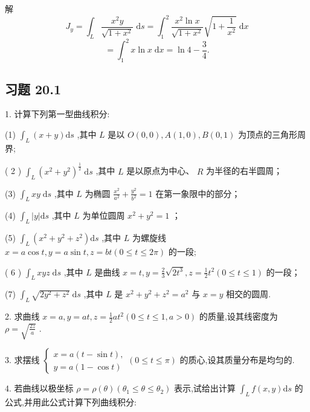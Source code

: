 解
\[
{J}_{y} = {\int }_{L}\frac{{x}^{2}y}{\sqrt{1 + {x}^{2}}}\mathrm{\;d}s = {\int }_{1}^{2}\frac{{x}^{2}\ln x}{\sqrt{1 + {x}^{2}}}\sqrt{1 + \frac{1}{{x}^{2}}}\mathrm{\;d}x
\]
\[
= {\int }_{1}^{2}x\ln x\mathrm{\;d}x = \ln 4 - \frac{3}{4}.
\]
\subsection{习题 20.1}

1. 计算下列第一型曲线积分:

(1) \({\int }_{L}\left( {x + y}\right) \mathrm{d}s\) ,其中 \(L\) 是以 \(O\left( {0,0}\right) ,A\left( {1,0}\right) ,B\left( {0,1}\right)\) 为顶点的三角形周界;

( 2 ) \({\int }_{L}{\left( {x}^{2} + {y}^{2}\right) }^{\frac{1}{2}}\mathrm{\;d}s\) ,其中 \(L\) 是以原点为中心、 \(R\) 为半径的右半圆周；

(3) \({\int }_{L}{xy}\mathrm{\;d}s\) ,其中 \(L\) 为椭圆 \(\frac{{x}^{2}}{{a}^{2}} + \frac{{y}^{2}}{{b}^{2}} = 1\) 在第一象限中的部分；

(4) \({\int }_{L}\left| y\right| \mathrm{d}s\) ,其中 \(L\) 为单位圆周 \({x}^{2} + {y}^{2} = 1\) ；

(5) \({\int }_{L}\left( {{x}^{2} + {y}^{2} + {z}^{2}}\right) \mathrm{d}s\) ,其中 \(L\) 为螺旋线 \(x = a\cos t,y = a\sin t,z = {bt}\left( {0 \leq  t \leq  {2\pi }}\right)\) 的一段;

( 6 ) \({\int }_{L}{xyz}\mathrm{\;d}s\) ,其中 \(L\) 是曲线 \(x = t,y = \frac{2}{3}\sqrt{2{t}^{3}},z = \frac{1}{2}{t}^{2}\left( {0 \leq  t \leq  1}\right)\) 的一段；

(7) \({\int }_{L}\sqrt{2{y}^{2} + {z}^{2}}\mathrm{\;d}s\) ,其中 \(L\) 是 \({x}^{2} + {y}^{2} + {z}^{2} = {a}^{2}\) 与 \(x = y\) 相交的圆周.

2. 求曲线 \(x = a,y = {at},z = \frac{1}{2}a{t}^{2}\left( {0 \leq  t \leq  1,a > 0}\right)\) 的质量,设其线密度为 \(\rho  = \sqrt{\frac{2z}{a}}\) .

3. 求摆线 \(\left\{  {\begin{array}{l} x = a\left( {t - \sin t}\right) , \\  y = a\left( {1 - \cos t}\right)  \end{array}\left( {0 \leq  t \leq  \pi }\right) }\right.\) 的质心,设其质量分布是均匀的.

4. 若曲线以极坐标 \(\rho  = \rho \left( \theta \right) \left( {{\theta }_{1} \leq  \theta  \leq  {\theta }_{2}}\right)\) 表示,试给出计算 \({\int }_{L}f\left( {x,y}\right) \mathrm{d}s\) 的公式,并用此公式计算下列曲线积分:

